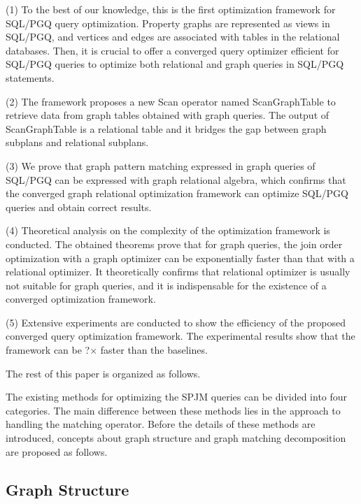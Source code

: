 (1) To the best of our knowledge, this is the first optimization framework for SQL/PGQ query optimization.
Property graphs are represented as views in SQL/PGQ, and vertices and edges are associated with tables in the relational databases.
Then, it is crucial to offer a converged query optimizer efficient for SQL/PGQ queries to optimize both relational and graph queries in SQL/PGQ statements.

(2) The framework proposes a new Scan operator named ScanGraphTable to retrieve data from graph tables obtained with graph queries.
The output of ScanGraphTable is a relational table and it bridges the gap between graph subplans and relational subplans.

(3) We prove that graph pattern matching expressed in graph queries of SQL/PGQ can be expressed with graph relational algebra, which confirms that the converged graph relational optimization framework can optimize SQL/PGQ queries and obtain correct results.



(4) Theoretical analysis on the complexity of the optimization framework is conducted.
The obtained theorems prove that for graph queries, the join order optimization with a graph optimizer can be exponentially faster than that with a relational optimizer. 
It theoretically confirms that relational optimizer is usually not suitable for graph queries, and it is indispensable for the existence of a converged optimization framework.

(5) Extensive experiments are conducted to show the efficiency of the proposed converged query optimization framework.
The experimental results show that the framework can be ?$\times$ faster than the baselines.

The rest of this paper is organized as follows.


The existing methods for optimizing the SPJM queries can be divided into four categories.
The main difference between these methods lies in the approach to handling the matching operator.
Before the details of these methods are introduced, concepts about graph structure and graph matching decomposition are proposed as follows.

\subsection{Graph Structure}


